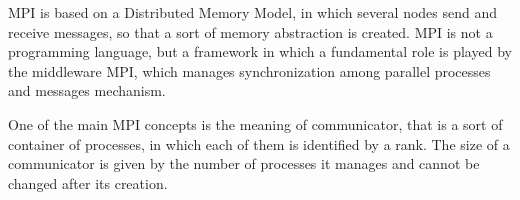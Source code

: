 MPI is based on a Distributed Memory Model, in which several nodes send and receive messages, so that a sort of memory abstraction is created.
MPI is not a programming language, but a framework in which a fundamental role is played by the middleware MPI, which manages synchronization among parallel processes and messages mechanism.

One of the main MPI concepts is the meaning of communicator, that is a sort of container of processes, in which each of them is identified by a rank.
The size of a communicator is given by the number of processes it manages and cannot be changed after its creation.


